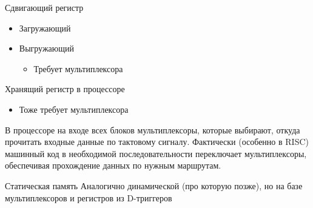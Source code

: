 \documentclass[xetex,aspectratio=43]{beamer}
\begin{document}
\begin{frame}{Сдвигающий регистр}
    \begin{itemize}
        \item
        Загружающий
        \item
        Выгружающий

        \begin{itemize}
            \item
            Требует мультиплексора
        \end{itemize}
    \end{itemize}
\end{frame}

\begin{frame}{Хранящий регистр в процессоре}
        \begin{itemize}
            \item
            Тоже требует мультиплексора
        \end{itemize}

        \pause

        В процессоре на входе всех блоков мультиплексоры, которые выбирают,
        откуда прочитать входные данные по тактовому сигналу. Фактически
        (особенно в RISC) машинный код в необходимой последовательности
        переключает мультиплексоры, обеспечивая прохождение данных по нужным
        маршрутам.
\end{frame}

\begin{frame}{Статическая память}
    Аналогично динамической (про которую позже), но на базе мультиплексоров и регистров из D-триггеров
\end{frame}

\section*{}
\end{document}

